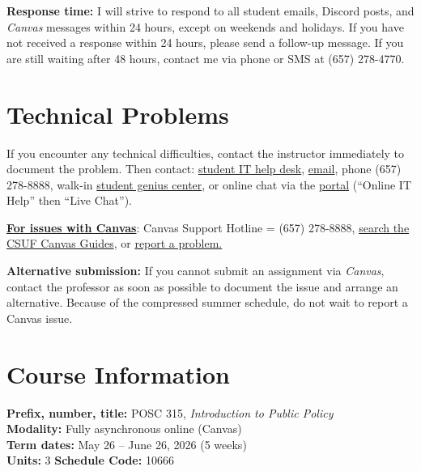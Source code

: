 \documentclass[12pt]{article}
\begin{document}
\vspace{0.5em}
\noindent \textbf{Response time:} I will strive to respond to all student emails, Discord posts, and \emph{Canvas} messages within 24 hours, except on weekends and holidays. If you have not received a response within 24 hours, please send a follow-up message. If you are still waiting after 48 hours, contact me via phone or SMS at (657) 278-4770.

\section*{Technical Problems}

If you encounter any technical difficulties, contact the instructor immediately to document the problem. Then contact: \href{http://www.fullerton.edu/it/students/helpdesk/index.php}{student IT help desk}, \href{mailto:StudentITHelpDesk@fullerton.edu}{email}, phone (657) 278-8888, walk-in \href{http://www.fullerton.edu/it/students/sgc/index.php}{student genius center}, or online chat via the \href{http://my.fullerton.edu}{portal} (``Online IT Help'' then ``Live Chat'').

\vspace{0.5em}
\noindent \textbf{\underline{For issues with Canvas}}: Canvas Support Hotline = (657) 278-8888, \href{https://canvashelp.fullerton.edu/}{search the CSUF Canvas Guides}, or \href{https://titans.service-now.com/sp?id=sc_cat_item&sys_id=f88efe80ebea6a10fb7cfcffcad0cdc6&subject=Canvas}{report a problem.}

\vspace{0.5em}
\noindent \textbf{Alternative submission:} If you cannot submit an assignment via \emph{Canvas}, contact the professor as soon as possible to document the issue and arrange an alternative. Because of the compressed summer schedule, do not wait to report a Canvas issue.

\section*{Course Information}
\noindent \textbf{Prefix, number, title:} POSC 315, \textit{Introduction to Public Policy} \\
\noindent \textbf{Modality:} Fully asynchronous online (Canvas) \\
\noindent \textbf{Term dates:} May 26 -- June 26, 2026 (5 weeks) \\
\noindent \textbf{Units:} 3 \quad \textbf{Schedule Code:} 10666
\end{document}
